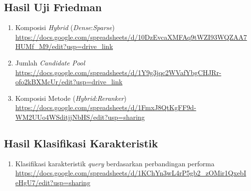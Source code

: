 \subsection*{Hasil Uji Friedman}

\begin{enumerate}
	\item Komposisi \textit{Hybrid} (\textit{Dense}:\textit{Sparse})\\
	\url{https://docs.google.com/spreadsheets/d/10DzEvcaXMFAq9tWZI93WQZAA7HUMf_M9/edit?usp=drive_link}
	\item Jumlah \textit{Candidate Pool}\\
	\url{https://docs.google.com/spreadsheets/d/1Y9g3jqc2WVafYbgCHJRr-ofo2kBXMcUr/edit?usp=drive_link}
	\item Komposisi Metode (\textit{Hybrid}:\textit{Reranker})\\
	\url{https://docs.google.com/spreadsheets/d/1FmxJ8QtKgFF9d-WM2UUo4WSditjjNbHS/edit?usp=sharing}
\end{enumerate}

\subsection*{Hasil Klasifikasi Karakteristik}

\begin{enumerate}
	\item Klasifikasi karakteristik \textit{query} berdasarkan perbandingan performa\\
	\url{https://docs.google.com/spreadsheets/d/1KChYn3wL4rP5gb2_zOMir1QxebIeHgU7/edit?usp=sharing}
\end{enumerate}
